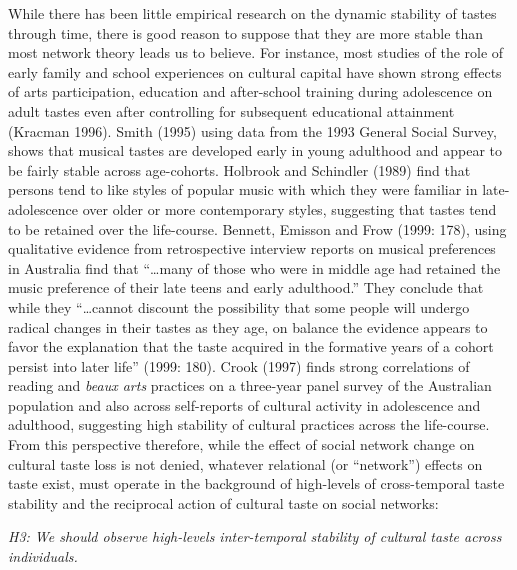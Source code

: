 While there has been little empirical research on the dynamic stability of tastes through time, there is good reason to suppose that they are more stable than most network theory leads us to believe. For instance, most studies of the role of early family and school experiences on cultural capital have shown strong effects of arts participation, education and after-school training during adolescence on adult tastes even after controlling for subsequent educational attainment (Kracman 1996). Smith (1995) using data from the 1993 General Social Survey, shows that musical tastes are developed early in young adulthood and appear to be fairly stable across age-cohorts. Holbrook and Schindler (1989) find that persons tend to like styles of popular music with which they were familiar in late-adolescence over older or more contemporary styles, suggesting that tastes tend to be retained over the life-course. Bennett, Emisson and Frow (1999: 178), using qualitative evidence from retrospective interview reports on musical preferences in Australia find that ``\ldots many of those who were in middle age had retained the music preference of their late teens and early adulthood.'' They conclude that while they ``\ldots cannot discount the possibility that some people will undergo radical changes in their tastes as they age, on balance the evidence appears to favor the explanation that the taste acquired in the formative years of a cohort persist into later life'' (1999: 180). Crook (1997) finds strong correlations of reading and \emph{beaux arts} practices on a three-year panel survey of the Australian population and also across self-reports of cultural activity in adolescence and adulthood, suggesting high stability of cultural practices across the life-course. From this perspective therefore, while the effect of social network change on cultural taste loss is not denied, whatever relational (or ``network'') effects on taste exist, must operate in the background of high-levels of cross-temporal taste stability and the reciprocal action of cultural taste on social networks:

\emph{H3: We should observe high-levels inter-temporal stability of cultural taste across individuals.}

